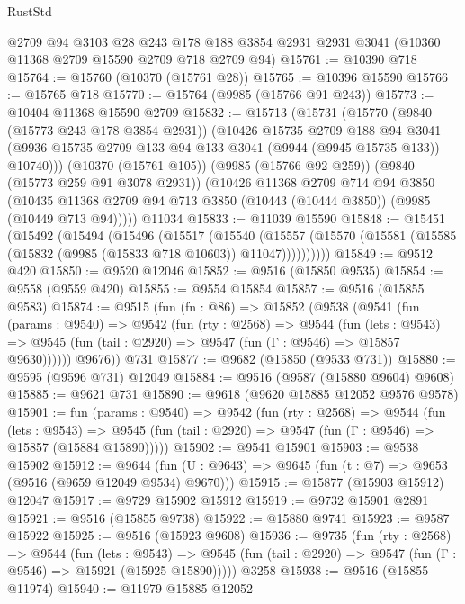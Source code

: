 \begin{lexlean}{RustStd}
\begin{coremodule}
    @2709
    @94
    @3103
    @28
    @243
    @178
    @188
    @3854
    @2931
    @2931
    @3041
    (@10360 @11368 @2709 @15590 @2709 @718 @2709 @94)
@15761 := @10390 @718
@15764 := @15760 (@10370 (@15761 @28))
@15765 := @10396 @15590
@15766 := @15765 @718
@15770 := @15764 (@9985 (@15766 @91 @243))
@15773 := @10404 @11368 @15590 @2709
@15832 := @15713
    (@15731
      (@15770
        (@9840 (@15773 @243 @178 @3854 @2931))
        (@10426
          @15735
          @2709
          @188
          @94
          @3041
          (@9936 @15735 @2709 @133 @94 @133 @3041 (@9944 (@9945 @15735 @133)) @10740)))
      (@10370 (@15761 @105))
      (@9985 (@15766 @92 @259))
      (@9840 (@15773 @259 @91 @3078 @2931))
      (@10426
        @11368
        @2709
        @714
        @94
        @3850
        (@10435 @11368 @2709 @94 @713 @3850 (@10443 (@10444 @3850)) (@9985 (@10449 @713 @94)))))
    @11034
@15833 := @11039 @15590
@15848 := @15451
    (@15492
      (@15494
        (@15496
          (@15517
            (@15540
              (@15557 (@15570 (@15581 (@15585 (@15832 (@9985 (@15833 @718 @10603)) @11047))))))))))
@15849 := @9512 @420
@15850 := @9520 @12046
@15852 := @9516 (@15850 @9535)
@15854 := @9558 (@9559 @420)
@15855 := @9554 @15854
@15857 := @9516 (@15855 @9583)
@15874 := @9515
    (fun (fn : @86) =>
    @15852
      (@9538
        (@9541
          (fun (params : @9540) =>
          @9542
            (fun (rty : @2568) =>
            @9544
              (fun (lets : @9543) =>
              @9545 (fun (tail : @2920) => @9547 (fun (Γ : @9546) => @15857 @9630))))))
        @9676))
    @731
@15877 := @9682 (@15850 (@9533 @731))
@15880 := @9595 (@9596 @731) @12049
@15884 := @9516 (@9587 (@15880 @9604) @9608)
@15885 := @9621 @731
@15890 := @9618 (@9620 @15885 @12052 @9576 @9578)
@15901 := fun (params : @9540) =>
  @9542
    (fun (rty : @2568) =>
    @9544
      (fun (lets : @9543) =>
      @9545 (fun (tail : @2920) => @9547 (fun (Γ : @9546) => @15857 (@15884 @15890)))))
@15902 := @9541 @15901
@15903 := @9538 @15902
@15912 := @9644
    (fun (U : @9643) => @9645 (fun (t : @7) => @9653 (@9516 (@9659 @12049 @9534) @9670)))
@15915 := @15877 (@15903 @15912) @12047
@15917 := @9729 @15902 @15912
@15919 := @9732 @15901 @2891
@15921 := @9516 (@15855 @9738)
@15922 := @15880 @9741
@15923 := @9587 @15922
@15925 := @9516 (@15923 @9608)
@15936 := @9735
    (fun (rty : @2568) =>
    @9544
      (fun (lets : @9543) =>
      @9545 (fun (tail : @2920) => @9547 (fun (Γ : @9546) => @15921 (@15925 @15890)))))
    @3258
@15938 := @9516 (@15855 @11974)
@15940 := @11979 @15885 @12052

\end{coremodule}
\end{lexlean}
